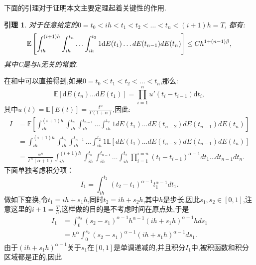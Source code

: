 \documentclass[12pt,final]{article}
\makeatletter
\numberwithin{equation}{section}
\numberwithin{figure}{section}
\numberwithin{table}{section}
\theoremstyle{plain}
\renewcommand{\proofname}{证明}
\newtheorem{Lemma}[Theorem]{引理}      %
\theoremstyle{Definition}
\theoremstyle{Remark}
\renewenvironment{proof}[1][\proofname]{\par
	\pushQED{\qed}%
	\normalfont \topsep6\p@\@plus6\p@\relax
	\trivlist\item[\hskip\labelsep
	\bfseries #1\@addpunct{\,:\,}]\ignorespaces
}{%
	\popQED\endtrivlist\@endpefalse
}
\makeatother
\begin{document}
	下面的引理对于证明本文主要定理起着关键性的作用. 
	\begin{Lemma}\label{Lemma:2}
		对于任意给定的$0 = t_0 < ih < t_1 < t_2 < \ldots <t_n <(i+1)h=T$, 都有:
		\begin{equation}
			\mathbb{E}\left[\int_{ih}^{(i+1)h}
			\int_{ih}^{t_n} \ldots \int_{ih}^{t_2} 1 \textnormal{d}E({t_1}) \ldots dE({t_{n-1}})dE({t_n})\right] \le Ch^{1+(n-1)\beta},
		\end{equation}
		其中C是与$h$无关的常数. 
	\end{Lemma}
	
	
	\begin{proof}    
		在\cite{daley2003introduction}和\cite{magdziarz2009stochastic}中可以直接得到,如果$0 = t_0 < t_1 < t_2 < \ldots <t_n$,那么:
		\begin{equation*}
			\mathbb{E}[\mathrm dE(t_n)\ldots\mathrm dE(t_1)]=\prod_{i=1}^nu'(t_i-t_{i-1})\mathrm dt_i, 
		\end{equation*}
		其中$u(t)=\mathbb{E}[E(t)]=\frac{t^\alpha}{\Gamma(1+\alpha)}$,因此:
		\begin{align*}
			I &= \mathbb{E}\left[\int_{ih}^{(i+1)h}
			\int_{ih}^{t_n}\int_{ih}^{t_{n-1}} \ldots \int_{ih}^{t_{2}} 1 dE(t_1) \ldots dE(t_{n-2})dE(t_{n-1})dE(t_n)\right] \\
			& = \int_{ih}^{(i+1)h}\int_{ih}^{t_n}\int_{ih}^{t_{n-1}}
			\ldots \int_{ih}^{t_{2}} 1 \mathbb{E}\left[dE(t_1) \ldots dE(t_{n-2})dE(t_{n-1})dE(t_n)\right] \\
			& = \frac{\alpha^n}{\Gamma^n(\alpha+1)}
			\int_{ih}^{(i+1)h}\int_{ih}^{t_n}\int_{ih}^{t_{n-1}} \ldots \int_{ih}^{t_{2}} \prod_{i=1}^{i=n}(t_i-t_{i-1})^{\alpha -1} dt_1 \ldots dt_{n-1}dt_n.
		\end{align*}
		下面单独考虑积分项：
		\begin{equation*}
			I_{1}=\int_{ih}^{t_{2}} (t_{2}-t_1)^{\alpha -1} t_1^{\alpha - 1} dt_1. 
		\end{equation*}
		做如下变换,令$t_{1} = ih + s_{1}h$,同时$t_2 = ih + s_2h$,其中$h$是步长,因此$s_1,s_{2} \in [0,1]$,注意这里的$i+1=\frac{T}{h}$,这样做的目的是不考虑时间在原点处,于是
		\begin{align*}
			I_1 &= \int_{0}^{s_{2}} (s_{2}-s_{1})^{\alpha -1}h^{\alpha -1} (ih + s_1h)^{\alpha - 1}h ds_1 \\
			&= h^{\alpha}\int_{0}^{s_{2}} (s_{2}-s_{1})^{\alpha -1} (ih + s_1h)^{\alpha - 1} ds_1.
		\end{align*}
		由于$(ih + s_1h)^{\alpha - 1}$关于$s_1$在$[0,1]$是单调递减的,并且积分$I_1$中,被积函数和积分区域都是正的,因此

\end{proof}
\end{document}
